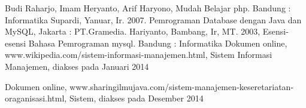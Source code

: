 \documentclass{jtetiproposalskripsi}
\begin{document}

\begin{thebibliography}{9}

Budi Raharjo, Imam Heryanto, Arif Haryono, Mudah Belajar php. Bandung : Informatika
Supardi, Yanuar, Ir. 2007. Pemrograman Database dengan Java dan MySQL, Jakarta : PT.Gramedia.
Hariyanto, Bambang, Ir, MT. 2003, Esensi-esensi Bahasa Pemrograman mysql. Bandung : Informatika
Dokumen online, www.wikipedia.com/sistem-informasi-manajemen.html, Sistem Informasi Manajemen, diakses pada Januari 2014

Dokumen online, www.sharingilmujava.com/sistem-manajemen-keseretariatan-oraganisasi.html, Sistem, diakses pada Desember 2014

\end{thebibliography}
\end{document}
